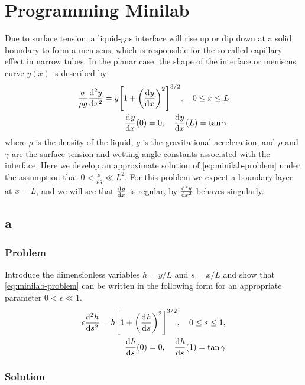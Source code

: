 \documentclass[12pt,twoside]{article}
\begin{document}
\section{Programming Minilab}
Due to surface tension, a liquid-gas interface will rise up or dip down at a
solid boundary to form a meniscus, which is responsible for the so-called
capillary effect in narrow tubes. In the planar case, the shape of the interface
or meniscus curve $y(x)$ is described by
\begin{equation}
  \label{eq:minilab-problem}
  \begin{aligned}
    \frac{\sigma}{\rho g}\od[2]{y}{x} = y {\left[ 1 + {\left( \od{y}{x}
          \right)}^2 \right]}^{3/2},\quad 0\le x\le L \\
    \od{y}{x}(0) = 0,\quad \od{y}{x}(L) = \tan\gamma.
  \end{aligned}
\end{equation}
where $\rho$ is the density of the liquid, $g$ is the gravitational
acceleration, and $\rho$ and $\gamma$ are the surface tension and wetting angle
constants associated with the interface. Here we develop an approximate solution
of \cref{eq:minilab-problem} under the assumption that $0<\frac{\sigma}{\rho
  g}\ll L^2$. For this problem we expect a boundary layer at $x=L$, and we will
see that $\od{y}{x}$ is regular, by $\od[2]{y}{x}$ behaves singularly.

\subsection{a}
\label{sec:minilab-part-a}
\subsubsection*{Problem}
Introduce the dimensionless variables $h=y/L$ and $s=x/L$ and show that
\cref{eq:minilab-problem} can be written in the following form for an
appropriate parameter $0<\epsilon\ll1$.
\begin{equation}
  \label{eq:minilab-problem-part-a}
  \begin{aligned}
    \epsilon\od[2]{h}{s} = h{\left[ 1+{\left( \od{h}{s} \right)}^2
      \right]}^{3/2},\quad 0\le s\le1, \\
    \od{h}{s}(0) = 0,\quad \od{h}{s}(1) = \tan\gamma
  \end{aligned}
\end{equation}
\subsubsection*{Solution}
\todo{}
\end{document}

